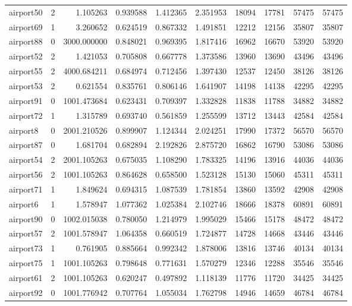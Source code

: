 \begin{longtable}{|l|r|r|r|r|r|r|r|r|r|}
airport50 & 2 & 1.105263 & 0.939588 & 1.412365 & 2.351953 & 18094 & 17781 & 57475 & 57475 \\
airport69 & 1 & 3.260652 & 0.624519 & 0.867332 & 1.491851 & 12212 & 12156 & 35807 & 35807 \\
airport88 & 0 & 3000.000000 & 0.848021 & 0.969395 & 1.817416 & 16962 & 16670 & 53920 & 53920 \\
airport52 & 2 & 1.421053 & 0.705808 & 0.667778 & 1.373586 & 13960 & 13690 & 43496 & 43496 \\
airport55 & 2 & 4000.684211 & 0.684974 & 0.712456 & 1.397430 & 12537 & 12450 & 38126 & 38126 \\
airport53 & 2 & 0.621554 & 0.835761 & 0.806146 & 1.641907 & 14198 & 14138 & 42295 & 42295 \\
airport91 & 0 & 1001.473684 & 0.623431 & 0.709397 & 1.332828 & 11838 & 11788 & 34882 & 34882 \\
airport72 & 1 & 1.315789 & 0.693740 & 0.561859 & 1.255599 & 13712 & 13443 & 42584 & 42584 \\
airport8 & 0 & 2001.210526 & 0.899907 & 1.124344 & 2.024251 & 17990 & 17372 & 56570 & 56570 \\
airport87 & 0 & 1.681704 & 0.682894 & 2.192826 & 2.875720 & 16862 & 16790 & 53086 & 53086 \\
airport54 & 2 & 2001.105263 & 0.675035 & 1.108290 & 1.783325 & 14196 & 13916 & 44036 & 44036 \\
airport56 & 2 & 1001.105263 & 0.864628 & 0.658500 & 1.523128 & 15130 & 15060 & 45311 & 45311 \\
airport71 & 1 & 1.849624 & 0.694315 & 1.087539 & 1.781854 & 13860 & 13592 & 42908 & 42908 \\
airport6 & 1 & 1.578947 & 1.077362 & 1.025384 & 2.102746 & 18666 & 18378 & 60891 & 60891 \\
airport90 & 0 & 1002.015038 & 0.780050 & 1.214979 & 1.995029 & 15466 & 15178 & 48472 & 48472 \\
airport57 & 2 & 1001.578947 & 1.064358 & 0.660519 & 1.724877 & 14728 & 14668 & 43446 & 43446 \\
airport73 & 1 & 0.761905 & 0.885664 & 0.992342 & 1.878006 & 13816 & 13746 & 40134 & 40134 \\
airport75 & 1 & 1001.105263 & 0.798648 & 0.771631 & 1.570279 & 12346 & 12288 & 35546 & 35546 \\
airport61 & 2 & 1001.105263 & 0.620247 & 0.497892 & 1.118139 & 11776 & 11720 & 34425 & 34425 \\
airport92 & 0 & 1001.776942 & 0.707764 & 1.055034 & 1.762798 & 14946 & 14659 & 46784 & 46784 \\

\end{longtable}

